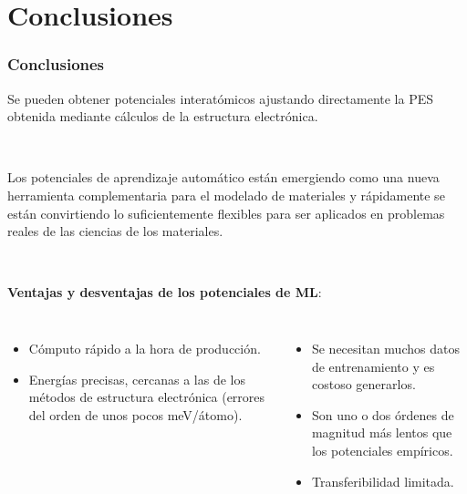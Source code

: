 \documentclass[aspectratio=169]{beamer}
\let\oldtextbf\textbf
\renewcommand{\textbf}[1]{\textcolor{nordblue}{\oldtextbf{#1}}}
\begin{document}
    \section{Conclusiones}

    \begin{frame}
        \frametitle{Conclusiones}

        Se pueden obtener potenciales interatómicos ajustando directamente la
        PES obtenida mediante cálculos de la estructura electrónica.
        
        \ \pause

        Los potenciales de aprendizaje automático están emergiendo como una nueva
        herramienta complementaria para el modelado de materiales y rápidamente 
        se están convirtiendo lo suficientemente flexibles para ser aplicados 
        en problemas reales de las ciencias de los materiales.


        \ \pause

        \textbf{Ventajas y desventajas de los potenciales de ML}:

        \pause 

        \begin{columns}
            \begin{itemize}
                \item Cómputo rápido a la hora de producción.
                \item Energías precisas, cercanas a las de los métodos de 
                    estructura electrónica (errores del orden de unos pocos 
                    meV/átomo).
            \end{itemize}

            \pause

            \begin{itemize}
                \item Se necesitan muchos datos de entrenamiento y es costoso 
                    generarlos.
                \item Son uno o dos órdenes de magnitud más lentos que los 
                    potenciales empíricos.
                \item Transferibilidad limitada. 
            \end{itemize}
        \end{columns}

    \end{frame}
\end{document}
